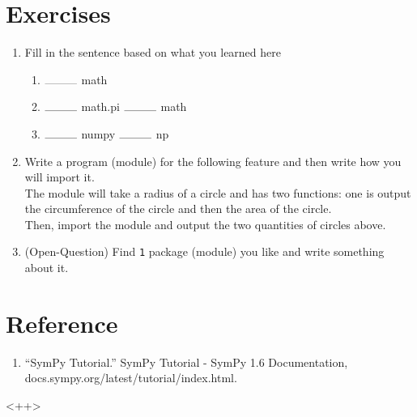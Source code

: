 \documentclass[12pt]{article}
\begin{document}
\section{Exercises}
\begin{enumerate}
	\item Fill in the sentence based on what you learned here
		\begin{enumerate}
			\item $\rule{1cm}{0.10mm}$ math
			\item $\rule{1cm}{0.10mm}$ math.pi $\rule{1cm}{0.10mm}$ math
			\item $\rule{1cm}{0.10mm}$ numpy $\rule{1cm}{0.10mm}$ np
		\end{enumerate}
	\item Write a program (module) for the following feature and then write how you will import it.
		\\ The module will take a radius of a circle and has two functions: one is output the circumference of the circle and then the area of the circle.
		\\ Then, import the module and output the two quantities of circles above.
	\item (Open-Question) Find \texttt{1} package (module) you like and write something about it.
\end{enumerate}
\newpage
\section{Reference}
\begin{enumerate}
	\item “SymPy Tutorial.” SymPy Tutorial - SymPy 1.6 Documentation, docs.sympy.org/latest/tutorial/index.html.
\end{enumerate}<++>
\end{document}
